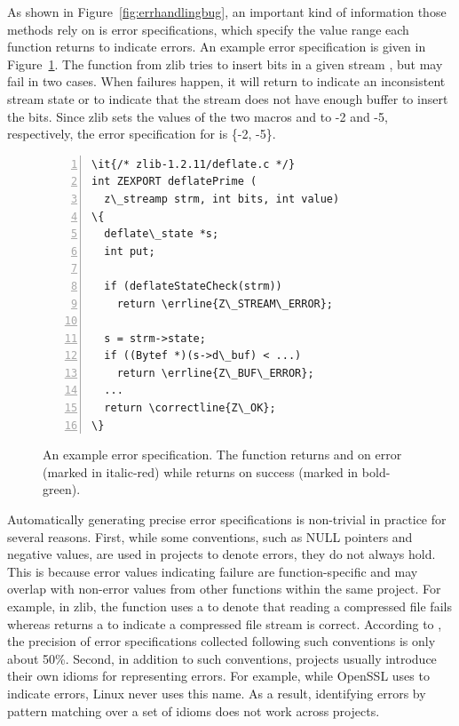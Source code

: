 \documentclass[12pt]{report}	%
\begin{document}
As shown in Figure~\ref{fig:errhandlingbug}, an important kind of information those methods rely on is
error specifications, which specify the value range each function
returns to indicate errors.
%
An example error specification is given in Figure~\ref{fig:errspec}.
The function  from zlib 
tries to insert bits in a given stream ,
but may fail in two cases.
%
When failures happen,
it will return  to indicate an inconsistent stream state
or  to indicate that the stream does not have enough buffer to insert the bits.
%
Since zlib sets the values of the two macros  and 
to -2 and -5, respectively, the error specification for  is \{-2, -5\}.

\begin{figure}[t]
\begin{Verbatim}[numbers=left,xleftmargin=6mm,fontsize=\footnotesize,
    commandchars=\\\{\}]
\it{/* zlib-1.2.11/deflate.c */}
int ZEXPORT deflatePrime (
  z\_streamp strm, int bits, int value)
\{
  deflate\_state *s;
  int put;

  if (deflateStateCheck(strm))
    return \errline{Z\_STREAM\_ERROR};

  s = strm->state;
  if ((Bytef *)(s->d\_buf) < ...)
    return \errline{Z\_BUF\_ERROR};
  ...
  return \correctline{Z\_OK};
\}
\end{Verbatim}
\caption{An example error specification.
The function  returns 
 and  on error (marked in italic-red)
while returns  on success (marked in bold-green).
}
\label{fig:errspec}
\end{figure}

%
Automatically generating precise error specifications 
is non-trivial in practice for several reasons.
%
First, 
while some conventions, such as
NULL pointers and negative values, are used in projects to denote errors,
they do not always hold.
This is because error values indicating failure are function-specific and 
may overlap with non-error values from other functions within
the same project. 
For example, in zlib, the function
 uses a
 to denote that reading a compressed file fails
whereas 
returns a  to indicate a compressed file stream is correct.
%
According to \cite{Kang:2016:AAI:2970276.2970354}, 
the precision
of error specifications collected following such 
conventions is only about 50\%. 
%
Second, in addition to such conventions, 
projects usually introduce their own idioms for representing errors.
%
For example, while OpenSSL uses  to indicate errors,
Linux never uses this name.
As a result, identifying errors by pattern matching over a set of idioms does not work across projects.
\end{document}

